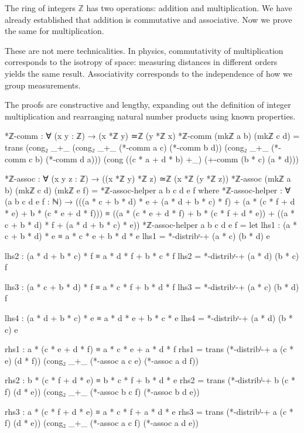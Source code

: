 \documentclass[11pt,a4paper]{book}
\begin{document}
The ring of integers $\mathbb{Z}$ has two operations: addition and multiplication. 
We have already established that addition is commutative and associative. 
Now we prove the same for multiplication.

These are not mere technicalities. In physics, commutativity of multiplication corresponds to the isotropy of space: measuring distances in different orders yields the same result.
Associativity corresponds to the independence of how we group measurements.

The proofs are constructive and lengthy, expanding out the definition of integer multiplication and rearranging natural number products using known properties.

\begin{code}
*ℤ-comm : ∀ (x y : ℤ) → (x *ℤ y) ≃ℤ (y *ℤ x)
*ℤ-comm (mkℤ a b) (mkℤ c d) = 
  trans (cong₂ _+_ (cong₂ _+_ (*-comm a c) (*-comm b d)) 
                   (cong₂ _+_ (*-comm c b) (*-comm d a)))
        (cong ((c * a + d * b) +_) (+-comm (b * c) (a * d)))

*ℤ-assoc : ∀ (x y z : ℤ) → ((x *ℤ y) *ℤ z) ≃ℤ (x *ℤ (y *ℤ z))
*ℤ-assoc (mkℤ a b) (mkℤ c d) (mkℤ e f) =
  *ℤ-assoc-helper a b c d e f
  where
    *ℤ-assoc-helper : ∀ (a b c d e f : ℕ) →
      (((a * c + b * d) * e + (a * d + b * c) * f) + (a * (c * f + d * e) + b * (c * e + d * f)))
      ≡ ((a * (c * e + d * f) + b * (c * f + d * e)) + ((a * c + b * d) * f + (a * d + b * c) * e))
    *ℤ-assoc-helper a b c d e f = 
      let 
        lhs1 : (a * c + b * d) * e ≡ a * c * e + b * d * e
        lhs1 = *-distribʳ-+ (a * c) (b * d) e
        
        lhs2 : (a * d + b * c) * f ≡ a * d * f + b * c * f
        lhs2 = *-distribʳ-+ (a * d) (b * c) f
        
        lhs3 : (a * c + b * d) * f ≡ a * c * f + b * d * f
        lhs3 = *-distribʳ-+ (a * c) (b * d) f
        
        lhs4 : (a * d + b * c) * e ≡ a * d * e + b * c * e
        lhs4 = *-distribʳ-+ (a * d) (b * c) e
        
        rhs1 : a * (c * e + d * f) ≡ a * c * e + a * d * f
        rhs1 = trans (*-distribˡ-+ a (c * e) (d * f)) (cong₂ _+_ (*-assoc a c e) (*-assoc a d f))
        
        rhs2 : b * (c * f + d * e) ≡ b * c * f + b * d * e
        rhs2 = trans (*-distribˡ-+ b (c * f) (d * e)) (cong₂ _+_ (*-assoc b c f) (*-assoc b d e))
        
        rhs3 : a * (c * f + d * e) ≡ a * c * f + a * d * e
        rhs3 = trans (*-distribˡ-+ a (c * f) (d * e)) (cong₂ _+_ (*-assoc a c f) (*-assoc a d e))
\end{code}
\end{document}
